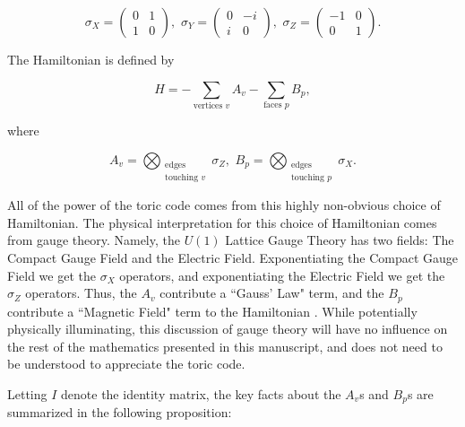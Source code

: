\documentclass{article}
\theoremstyle{definition}
\numberwithin{figure}{section}
\begin{document}
$$
\sigma_X=
\begin{pmatrix}
0 & 1\\
1 & 0
\end{pmatrix},\,\,
\sigma_Y=
\begin{pmatrix}
0 & -i\\
i & 0
\end{pmatrix},\,\,
\sigma_Z=
\begin{pmatrix}
-1 & 0\\
0 & 1
\end{pmatrix}.
$$

The Hamiltonian is defined by

$$H=-\sum_{\text{vertices } v}A_v-\sum_{\text{faces } p}B_p,$$

where

$$A_v=\bigotimes_{\substack{\text{edges}\\ \text{touching }v}}\sigma_Z,\,\, B_p=\bigotimes_{\substack{\text{edges}\\ \text{touching }p}}\sigma_X.$$

All of the power of the toric code comes from this highly non-obvious choice of Hamiltonian. The physical interpretation for this choice of Hamiltonian comes from gauge theory. Namely, the $U(1)$ Lattice Gauge Theory has two fields: The Compact Gauge Field and the Electric Field. Exponentiating the Compact Gauge Field we get the $\sigma_X$ operators, and exponentiating the Electric Field we get the $\sigma_Z$ operators. Thus, the $A_v$ contribute a ``Gauss' Law" term, and the $B_p$ contribute a ``Magnetic Field" term to the Hamiltonian \cite{oh2022rank}. While potentially physically illuminating, this discussion of gauge theory will have no influence on the rest of the mathematics presented in this manuscript, and does not need to be understood to appreciate the toric code.

Letting $I$ denote the identity matrix, the key facts about the $A_v$s and $B_p$s are summarized in the following proposition:
\end{document}
